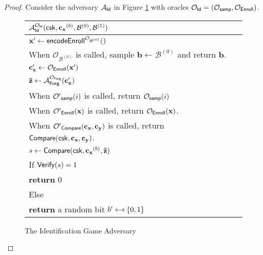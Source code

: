 \begin{proof}

	Consider the adversary $\mathcal{A}_{\sf Id}$ in Figure \ref{fig:id_game_ad} with oracles $\mathcal{O}_{\sf Id} = (\mathcal{O}_{\sf samp}, \mathcal{O}_{\sf Enroll})$.

\begin{figure}[htp]
	\begin{center}
	\begin{tabular}{l c}
		$\mathcal{A}_{\sf Id}^{\mathcal{O}_{\sf Id}}({\sf csk}, \mathbf{c_x}^{(b)}, \mathcal{B}^{(0)}, \mathcal{B}^{(1)})$\\

			\hline

			$\mathbf{x'} \gets {\sf encodeEnroll}^{\mathcal{O}_{\mathcal{B}^{(0)}}}()$ \\

			\qquad When $\mathcal{O}_{\mathcal{B}^{(0)}}$ is called, sample $\mathbf{b} \gets \mathcal{B}^{(0)}$ and return $\mathbf{b}$. \\

			$\mathbf{c_x'} \gets \mathcal{O}_{\sf Enroll}(\mathbf{x'})$ \\

			$\mathbf{\tilde{z}} \gets \mathcal{A}_{\sf Forg}^{\mathcal{O}_{\sf Forg}} ( \mathbf{c_x'} )$ \\
			\qquad When $\mathcal{O'}_{\sf samp}(i)$ is called, return $\mathcal{O}_{\sf samp}(i)$ \\
			\qquad When $\mathcal{O'}_{\sf Enroll}(\mathbf{x})$ is called, return $\mathcal{O}_{\sf Enroll}(\mathbf{x})$. \\
			\qquad When $\mathcal{O'}_{\sf Compare}(\mathbf{c_x}, \mathbf{c_y})$ is called, return ${\sf Compare}({\sf csk}, \mathbf{c_x}, \mathbf{c_y})$. \\

			$s \gets {\sf Compare}({\sf csk}, \mathbf{c_x}^{(b)}, \mathbf{\tilde{z}})$ \\

			If ${\sf Verify}(s) = 1$ \\
				\qquad \textbf{return} $0$ \\

			Else \\
				\qquad \textbf{return} a random bit $b' \getsdollar \{0, 1\}$
			
	\end{tabular}
	\end{center}
	\caption{The Identification Game Adversary}
	\label{fig:id_game_ad}
\end{figure}


\end{proof}

